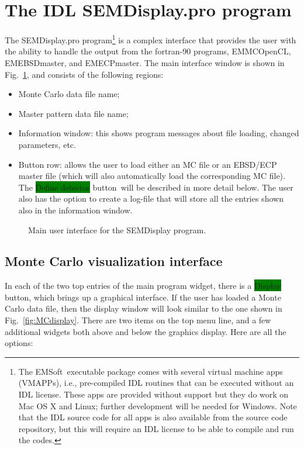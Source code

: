 \documentclass[DIV=calc, paper=letter, fontsize=11pt]{scrartcl}	 %
\newcommand{\ctp}{\textsf{EMSoft}}
\newcommand{\button}[1]{\colorbox{green}{\textsf{#1}} button}
\begin{document}
\section{The IDL \protect\textsf{SEMDisplay.pro} program\label{sec:idl}}
The \textsf{SEMDisplay.pro} program\footnote{The \ctp\ executable package comes with several virtual machine apps (VMAPPs), 
i.e., pre-compiled IDL routines that can be executed without an IDL license.  These apps are provided without support but they do work 
on Mac OS X and Linux; further development will be needed for Windows.  Note that the IDL source code for all apps is also available from
the source code repository, but this will require an IDL license to be able to compile and run the codes.} is a complex interface that provides the user with the ability to handle the 
output from the fortran-90 programs, \textsf{EMMCOpenCL}, \textsf{EMEBSDmaster}, and \textsf{EMECPmaster}.  The main
interface window is shown in Fig.~\ref{fig:EBSDmain}, and consists of the following regions:
\begin{itemize}
	\item Monte Carlo data file name;
	\item Master pattern data file name;
	\item Information window: this shows program messages about file loading, changed parameters, etc.
	\item Button row: allows the user to load either an MC file or an EBSD/ECP master file (which will also automatically load the 
	corresponding MC file).  The \button{Define detector}\ will be described in more detail below.  The user also has the option to 
	create a log-file that will store all the entries shown also in the information window.
\end{itemize}

\begin{figure}[t]
\leavevmode\centering
\epsfxsize=3in
\caption{\label{fig:EBSDmain}Main user interface for the SEMDisplay program.}
\end{figure}

\subsection{Monte Carlo visualization interface\label{sec:idlMC}}
In each of the two top entries of the main program widget, there is a \button{Display}, which brings up a graphical interface.  If the user has loaded a Monte Carlo data file, 
then the display window will look similar to the one shown in Fig.~\ref{fig:MCdisplay}.  There are two items on the top menu line, and a few additional widgets both 
above and below the graphics display.  Here are all the options:
\end{document}
